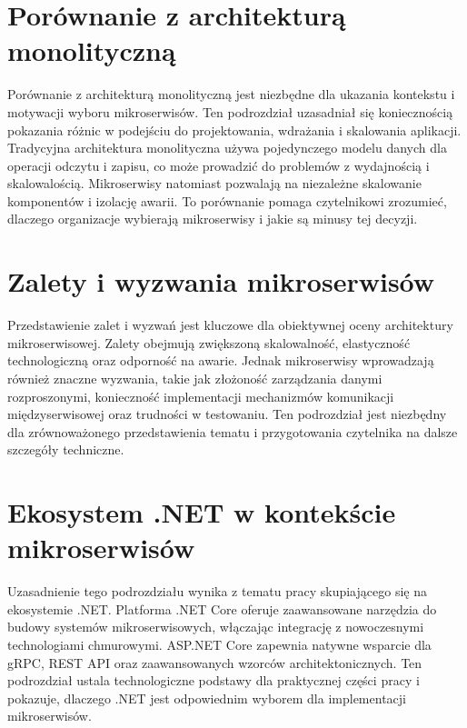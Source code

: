 \section{Porównanie z architekturą monolityczną}
\label{sec:PorownanieMikroserwisyMonolit}

Porównanie z architekturą monolityczną jest niezbędne dla ukazania kontekstu i motywacji wyboru mikroserwisów. Ten podrozdział uzasadniał się koniecznością pokazania różnic w podejściu do projektowania, wdrażania i skalowania aplikacji. Tradycyjna architektura monolityczna używa pojedynczego modelu danych dla operacji odczytu i zapisu, co może prowadzić do problemów z wydajnością i skalowalością. Mikroserwisy natomiast pozwalają na niezależne skalowanie komponentów i izolację awarii. To porównanie pomaga czytelnikowi zrozumieć, dlaczego organizacje wybierają mikroserwisy i jakie są minusy tej decyzji.

\section{Zalety i wyzwania mikroserwisów}
\label{sec:ZaletyWyzwaniaMikroserwisow}

Przedstawienie zalet i wyzwań jest kluczowe dla obiektywnej oceny architektury mikroserwisowej. Zalety obejmują zwiększoną skalowalność, elastyczność technologiczną oraz odporność na awarie. Jednak mikroserwisy wprowadzają również znaczne wyzwania, takie jak złożoność zarządzania danymi rozproszonymi, konieczność implementacji mechanizmów komunikacji międzyserwisowej oraz trudności w testowaniu. Ten podrozdział jest niezbędny dla zrównoważonego przedstawienia tematu i przygotowania czytelnika na dalsze szczegóły techniczne.

\section{Ekosystem .NET w kontekście mikroserwisów}
\label{sec:EkosystemNET}

Uzasadnienie tego podrozdziału wynika z tematu pracy skupiającego się na ekosystemie .NET. Platforma .NET Core oferuje zaawansowane narzędzia do budowy systemów mikroserwisowych, włączając integrację z nowoczesnymi technologiami chmurowymi. ASP.NET Core zapewnia natywne wsparcie dla gRPC, REST API oraz zaawansowanych wzorców architektonicznych. Ten podrozdział ustala technologiczne podstawy dla praktycznej części pracy i pokazuje, dlaczego .NET jest odpowiednim wyborem dla implementacji mikroserwisów.